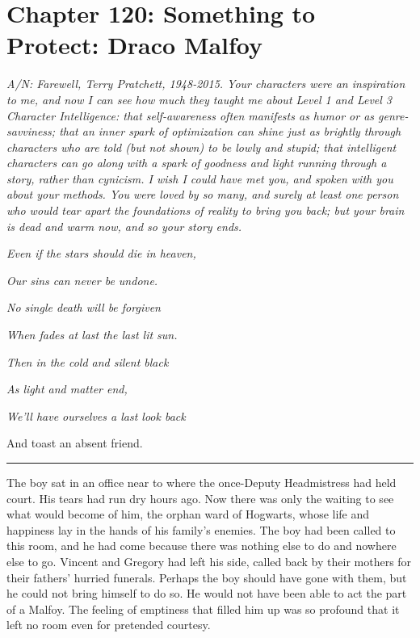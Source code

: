 \chapter{Chapter 120: Something to Protect: Draco Malfoy}
\emph{A/N: Farewell, Terry Pratchett, 1948-2015. Your characters were an inspiration to me, and now I can see how much they taught me about Level 1 and Level 3 Character Intelligence: that self-awareness often manifests as humor or as genre-savviness; that an inner spark of optimization can shine just as brightly through characters who are told (but not shown) to be lowly and stupid; that intelligent characters can go along with a spark of goodness and light running through a story, rather than cynicism. I wish I could have met you, and spoken with you about your methods. You were loved by so many, and surely at least one person who would tear apart the foundations of reality to bring you back; but your brain is dead and warm now, and so your story ends.}

\emph{Even if the stars should die in heaven,}

\emph{Our sins can never be undone.}

\emph{No single death will be forgiven}

\emph{When fades at last the last lit sun.}

\emph{Then in the cold and silent black}

\emph{As light and matter end,}

\emph{We'll have ourselves a last look back}

And toast an absent friend.

\begin{center}\rule{3in}{0.4pt}\end{center}

The boy sat in an office near to where the once-Deputy Headmistress had held court. His tears had run dry hours ago. Now there was only the waiting to see what would become of him, the orphan ward of Hogwarts, whose life and happiness lay in the hands of his family's enemies. The boy had been called to this room, and he had come because there was nothing else to do and nowhere else to go. Vincent and Gregory had left his side, called back by their mothers for their fathers' hurried funerals. Perhaps the boy should have gone with them, but he could not bring himself to do so. He would not have been able to act the part of a Malfoy. The feeling of emptiness that filled him up was so profound that it left no room even for pretended courtesy.

